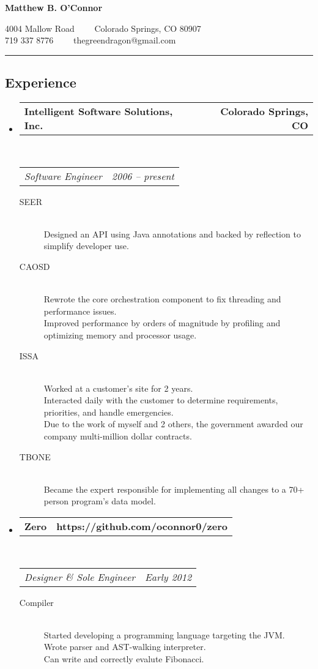 \documentclass[10pt,letterpaper]{article}
\makeatletter
\newcommand{\headerrow}[2]
{\begin{tabular*}{\linewidth}{l@{\extracolsep{\fill}}r}
	#1 &
	#2 \\
\end{tabular*}}
\makeatother
\begin{document}
\begin{center}
{\LARGE \textbf{Matthew B. O'Connor}}

4004 Mallow Road\ \ \textbullet
\ \ Colorado Springs, CO 80907
\\
719 337 8776\ \ \textbullet
\ \ thegreendragon@gmail.com
\end{center}

\hrule
\vspace{-0.4em}
\subsection*{Experience}

\begin{itemize}
	\parskip=0.1em

	\item
	\headerrow
		{\textbf{Intelligent Software Solutions, Inc.}}
		{\textbf{Colorado Springs, CO}}
	\\
	\headerrow
		{\emph{Software Engineer}}
		{\emph{2006 -- present}}
	\begin{description}
		\item[SEER] \hfill \\
				Designed an API using Java annotations and backed by reflection to simplify developer use.
		\item[CAOSD] \hfill \\
				Rewrote the core orchestration component to fix threading and performance issues. \\
				Improved performance by orders of magnitude by profiling and optimizing memory and processor usage.
		\item[ISSA] \hfill \\
				Worked at a customer's site for 2  years. \\
				Interacted daily with the customer to determine requirements, priorities, and handle emergencies. \\
				Due to the work of myself and 2 others, the government awarded our company multi-million dollar contracts.
		\item[TBONE] \hfill \\
				Became the expert responsible for implementing all changes to a 70+ person program's data model.
	\end{description}

	\item
	\headerrow
		{\textbf{Zero}}
		{\textbf{https://github.com/oconnor0/zero}}
	\\
	\headerrow
		{\emph{Designer \& Sole Engineer}}
		{\emph{Early 2012}}
	\begin{description}
		\item[Compiler] \hfill \\
			Started developing a programming language targeting the JVM. \\
			Wrote parser and AST-walking interpreter. \\
			Can write and correctly evalute Fibonacci.
	\end{description}

\end{itemize}
\end{document}
